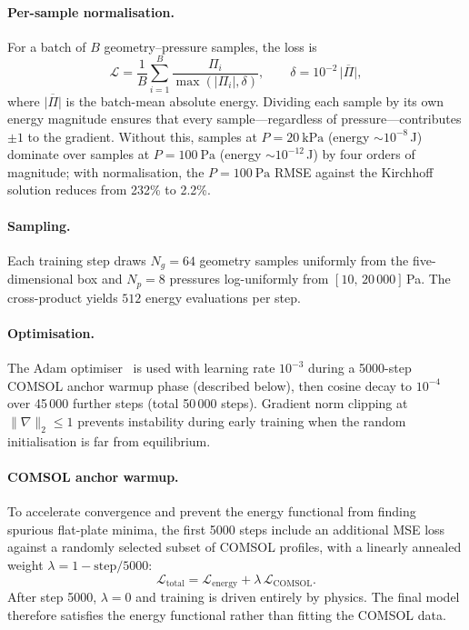 \documentclass[review,12pt]{elsarticle}
\begin{document}
\paragraph{Per-sample normalisation.}
For a batch of $B$ geometry–pressure samples, the loss is
\begin{equation}
    \mathcal{L} = \frac{1}{B}\sum_{i=1}^{B}
                  \frac{\Pi_i}{\max(|\Pi_i|, \delta)},
    \qquad \delta = 10^{-2}\,\overline{|\Pi|},
    \label{eq:loss}
\end{equation}
where $\overline{|\Pi|}$ is the batch-mean absolute energy. Dividing each
sample by its own energy magnitude ensures that every sample—regardless of
pressure—contributes $\pm 1$ to the gradient. Without this, samples at
$P = \SI{20}{\kilo\pascal}$ (energy $\sim 10^{-8}$\,J) dominate over samples
at $P = \SI{100}{\pascal}$ (energy $\sim 10^{-12}$\,J) by four orders of
magnitude; with normalisation, the $P = \SI{100}{\pascal}$ RMSE against the
Kirchhoff solution reduces from 232\% to 2.2\%.

\paragraph{Sampling.}
Each training step draws $N_g = 64$ geometry samples uniformly from the
five-dimensional box and $N_p = 8$ pressures log-uniformly from
$[10,\,20\,000]$\,Pa. The cross-product yields $512$ energy evaluations per
step.

\paragraph{Optimisation.}
The Adam optimiser~\cite{kingma2015} is used with learning rate $10^{-3}$
during a 5000-step COMSOL anchor warmup phase (described below), then cosine
decay to $10^{-4}$ over 45\,000 further steps (total 50\,000 steps). Gradient
norm clipping at $\|\nabla\|_2 \le 1$ prevents instability during early
training when the random initialisation is far from equilibrium.

\paragraph{COMSOL anchor warmup.}
To accelerate convergence and prevent the energy functional from finding
spurious flat-plate minima, the first 5000 steps include an additional MSE
loss against a randomly selected subset of COMSOL profiles, with a linearly
annealed weight $\lambda = 1 - \text{step}/5000$:
\begin{equation}
    \mathcal{L}_\mathrm{total} = \mathcal{L}_\mathrm{energy}
                                + \lambda\,\mathcal{L}_\mathrm{COMSOL}.
    \label{eq:total_loss}
\end{equation}
After step 5000, $\lambda = 0$ and training is driven entirely by physics.
The final model therefore satisfies the energy functional rather than
fitting the COMSOL data.
\end{document}
